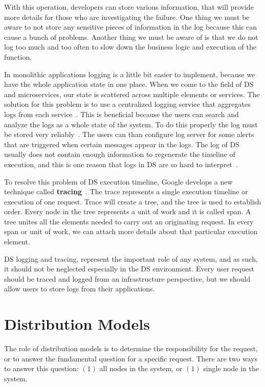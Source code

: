 With this operation, developers can store various information, that will provide more details for those who are investigating the failure. One thing we must be aware to not store any sensitive pieces of information in the log because this can cause a bunch of problems. Another thing we must be aware of is that we do not log too much and too often to slow down the business logic and execution of the function.

In monolithic applications logging is a little bit easier to implement, because we have the whole application state in one place. When we come to the field of DS and microservices, our state is scattered across multiple elements or services. The solution for this problem is to use a centralized logging service that aggregates logs from each service~\cite{BeschastnikhWBE16}. This is beneficial because the users can search and analyze the logs as a whole state of the system. To do this properly the log must be stored very reliably~\cite{DanielsST87}. The users can than configure log server for some alerts that are triggered when certain messages appear in the logs. The log of DS usually does not contain enough information to regenerate the timeline of execution, and this is one reason that logs in DS are so hard to interpret~\cite{BeschastnikhWBE16}.

To resolve this problem of DS execution timeline, Google develops a new technique called \textbf{tracing}~\cite{36356}. The trace represents a single execution timeline or execution of one request. Trace will create a tree, and the tree is used to establish order. Every node in the tree represents a unit of work and it is called span. A tree unites all the elements needed to carry out an originating request. In every span or unit of work, we can attach more details about that particular execution element.

DS logging and tracing, represent the important role of any system, and as such, it should not be neglected especially in the DS environment. Every user request should be traced and logged from an infrastructure perspective, but we should allow users to store logs from their applications.
%
%
\section{Distribution Models}\label{sec:distribution_models}
%
The role of distribution models is to determine the responsibility for the request, or to answer the fundamental question  for a specific request. There are two ways to answer this question: $(1)$ all nodes in the system, or $(1)$ single node in the system.
%
%
